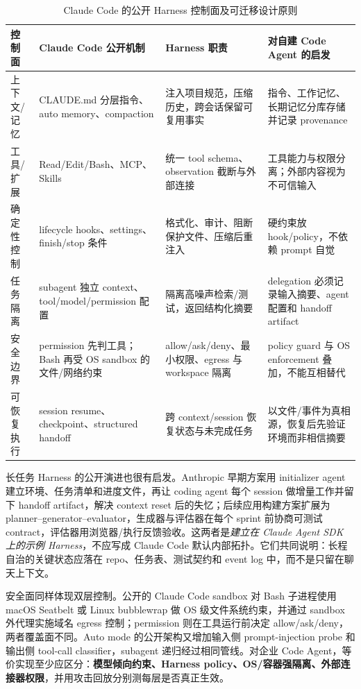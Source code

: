 \documentclass[10pt,a4paper,UTF8,fontset=none]{ctexart}
\newcommand{\ident}[1]{{\rmfamily #1}}
\begin{document}
\begin{table}[htbp]
\centering
\caption{Claude Code 的公开 Harness 控制面及可迁移设计原则}
\label{zh:tab:claude-code-public-architecture}
\small
\begin{tabularx}{\textwidth}{p{2.4cm}p{4.2cm}Y Y}
\toprule
控制面 & Claude Code 公开机制 & Harness 职责 & 对自建 Code Agent 的启发 \\
\midrule
上下文/记忆 & \ident{CLAUDE.md} 分层指令、auto memory、compaction & 注入项目规范，压缩历史，跨会话保留可复用事实 & 指令、工作记忆、长期记忆分库存储并记录 provenance\cite{zh:claudecodememory2026} \\
工具/扩展 & Read/Edit/Bash、MCP、Skills & 统一 tool schema、observation 截断与外部连接 & 工具能力与权限分离；外部内容视为不可信输入 \\
确定性控制 & lifecycle hooks、settings、finish/stop 条件 & 格式化、审计、阻断保护文件、压缩后重注入 & 硬约束放 hook/policy，不依赖 prompt 自觉\cite{zh:claudecodehooks2026} \\
任务隔离 & subagent 独立 context、tool/model/permission 配置 & 隔离高噪声检索/测试，返回结构化摘要 & delegation 必须记录输入摘要、agent 配置和 handoff artifact\cite{zh:claudecodesubagents2026} \\
安全边界 & permission 先判工具；Bash 再受 OS sandbox 的文件/网络约束 & allow/ask/deny、最小权限、egress 与 workspace 隔离 & policy guard 与 OS enforcement 叠加，不能互相替代\cite{zh:claudecodesandbox2026} \\
可恢复执行 & session resume、checkpoint、structured handoff & 跨 context/session 恢复状态与未完成任务 & 以文件/事件为真相源，恢复后先验证环境而非相信摘要 \\
\bottomrule
\end{tabularx}
\end{table}

长任务 Harness 的公开演进也很有启发。Anthropic 早期方案用 initializer agent 建立环境、任务清单和进度文件，再让 coding agent 每个 session 做增量工作并留下 handoff artifact，解决 context reset 后的失忆\cite{zh:anthropic2025longharness}；后续应用构建方案扩展为 planner--generator--evaluator，生成器与评估器在每个 sprint 前协商可测试 contract，评估器用浏览器/执行反馈验收\cite{zh:anthropic2026harnessdesign}。这两者是\emph{建立在 Claude Agent SDK 上的示例 Harness}，不应写成 Claude Code 默认内部拓扑。它们共同说明：长程自治的关键状态应落在 repo、任务表、测试契约和 event log 中，而不是只留在聊天上下文。

安全面同样体现双层控制。公开的 Claude Code sandbox 对 Bash 子进程使用 macOS Seatbelt 或 Linux bubblewrap 做 OS 级文件系统约束，并通过 sandbox 外代理实施域名 egress 控制；permission 则在工具运行前决定 allow/ask/deny，两者覆盖面不同\cite{zh:claudecodesandbox2026}。Auto mode 的公开架构又增加输入侧 prompt-injection probe 和输出侧 tool-call classifier，subagent 递归经过相同管线\cite{zh:anthropic2026automode}。对企业 Code Agent，等价实现至少应区分：\textbf{模型倾向约束、Harness policy、OS/容器强隔离、外部连接器权限}，并用攻击回放分别测每层是否真正生效。
\end{document}
